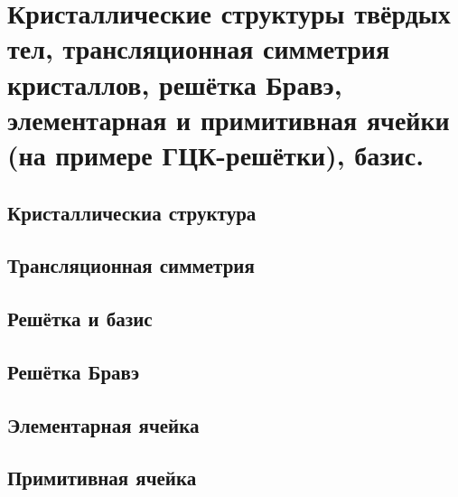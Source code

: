 \section{Кристаллические структуры твёрдых тел, трансляционная симметрия кристаллов, решётка Бравэ, элементарная и примитивная ячейки (на примере ГЦК-решётки), базис.}

\subsection{Кристаллическиа структура}
\subsection{Трансляционная симметрия}
\subsection{Решётка и базис}
\subsection{Решётка Бравэ}
\subsection{Элементарная ячейка }
\subsection{Примитивная ячейка}